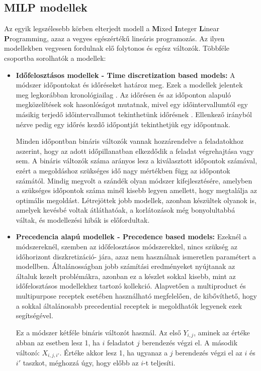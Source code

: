 \subsection{MILP modellek}
Az egyik legszélesebb körben elterjedt modell a \textbf{M}ixed \textbf{I}nteger \textbf{L}inear \textbf{P}rogramming, azaz a vegyes egészértékű lineáris programozás. Az ilyen modellekben vegyesen fordulnak elő folytonos és egész változók. Többféle csoportba sorolhatók a modellek:
\begin{itemize}
  \item[] \textbf{Időfelosztásos modellek - Time discretization based models:} A módszer időpontokat és időréseket határoz meg. Ezek a modellek jelentek meg legkorábban kronológiailag \cite{kondili}. Az időrésen és az időponton alapuló megközelítések sok hasonlóságot mutatnak, mivel egy időintervallumtól egy másikig terjedő időintervallumot tekinthetünk időrésnek \cite{susarla}.  Ellenkező irányból nézve pedig egy időrés kezdő időpontját tekinthetjük egy időpontnak.  
  
Minden időpontban bináris változók vannak hozzárendelve a feladatokhoz aszerint, hogy az adott időpillanatban elkezdődik a feladat végrehajtása vagy sem. A bináris változók száma arányos lesz a kiválasztott időpontok számával, ezért a megoldáshoz szükséges idő nagy mértékben függ az időpontok számától. Mindig megvolt a szándék olyan módszer kifejlesztésére, amelyben a szükséges időpontok száma minél kisebb legyen amellett, hogy megtalálja az optimális megoldást. Létrejöttek jobb modellek, azonban készültek olyanok is, amelyek kevésbé voltak átláthatóak, a korlátozások még bonyolultabbá váltak, és modellezési hibák is előfordultak.
  
  \item[] \textbf{Precedencia alapú modellek - Precedence based models:} Ezeknél a módszereknél, szemben az időfelosztásos módszerekkel, nincs szükség az időhorizont diszkretizáció- jára, azaz nem használnak ismeretlen paramétert a modellben. Általánosságban jobb számítási eredményeket nyújtanak az általuk kezelt problémákra, azonban ez a készlet sokkal kisebb, mint az időfelosztásos modellekhez tartozó kollekció. Alapvetően a multiproduct és multipurpose receptek esetében használható megfelelően, de kibővíthető, hogy a sokkal általánosabb precedential receptek is megoldhatók legyenek ezek segítségével. 
  
Ez a módszer kétféle bináris változót használ. Az első $Y_{i,j}$, aminek az értéke abban az esetben lesz 1, ha $i$ feladatot $j$ berendezés végzi el. A második változó: $X_{i,j,i'}$. Értéke akkor lesz 1, ha ugyanaz a $j$ berendezés végzi el az $i$ és $i'$ taszkot, méghozzá úgy, hogy előbb az $i$-t teljesíti. 
\end{itemize}

